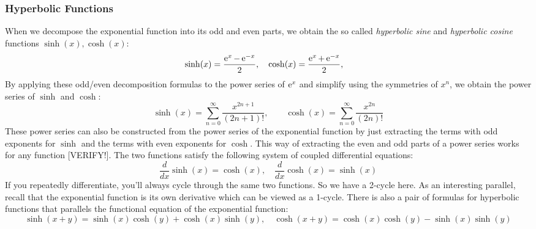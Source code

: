









\subsubsection{Hyperbolic Functions}
When we decompose the exponential function into its odd and even parts, we obtain the so called \emph{hyperbolic sine} and \emph{hyperbolic cosine} functions $\sinh(x), \cosh(x)$:
\begin{equation}
\sinh(x) =	\frac{\operatorname{\mathrm{e}}^x - \operatorname{\mathrm{e}}^{-x}}{2}, \quad	
\cosh(x) =	\frac{\operatorname{\mathrm{e}}^x + \operatorname{\mathrm{e}}^{-x}}{2}, \quad
\end{equation}
By applying these odd/even decomposition formulas to the power series of $\operatorname{\mathrm{e}}^x$ and simplify using the symmetries of $x^n$, we obtain the power series of $\sinh$ and $\cosh$: 
\begin{equation}
\sinh(x) = \sum_{n=0}^{\infty} \frac{x^{2n+1}}{(2n+1)!}, \qquad
\cosh(x) = \sum_{n=0}^{\infty} \frac{x^{2n}  }{(2n)!}
\end{equation}
These power series can also be constructed from the power series of the exponential function by just extracting the terms with odd exponents for $\sinh$ and the terms with even exponents for $\cosh$. This way of extracting the even and odd parts of a power series works for any function [VERIFY!]. The two functions satisfy the following system of coupled differential equations:
\begin{equation}
\frac{d}{dx} \sinh(x) = \cosh(x), \quad
\frac{d}{dx} \cosh(x) = \sinh(x)
\end{equation} 
If you repeatedly differentiate, you'll always cycle through the same two functions. So we have a 2-cycle here. As an interesting parallel, recall that the exponential function is its own derivative which can be viewed as a 1-cycle. There is also a pair of formulas for hyperbolic functions that parallels the functional equation of the exponential function:
\begin{equation}
\sinh(x+y) = \sinh(x) \cosh(y) + \cosh(x) \sinh(y), \quad
\cosh(x+y) = \cosh(x) \cosh(y) - \sinh(x) \sinh(y)
\end{equation}


